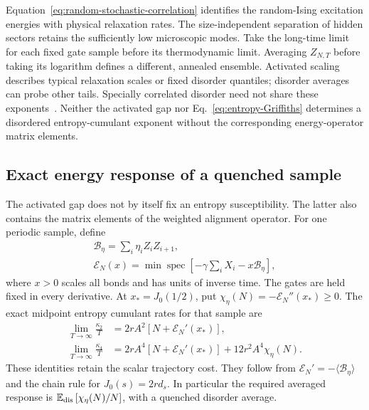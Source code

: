 \documentclass[aps,pre,reprint,amsmath,amssymb,longbibliography,floatfix]{revtex4-2}
\newcommand{\E}{\mathbb E}
\begin{document}
Equation~\eqref{eq:random-stochastic-correlation} identifies the
random-Ising excitation energies with physical relaxation rates.
The size-independent separation of hidden sectors retains the
sufficiently low microscopic modes.
Take the long-time limit for each fixed gate sample before its
thermodynamic limit. Averaging $Z_{N,T}$ before taking its logarithm
defines a different, annealed ensemble. Activated scaling describes
typical relaxation scales or fixed disorder quantiles; disorder averages
can probe other tails. Specially correlated disorder need not share
these exponents~\cite{ShiraiTanaka2021}. Neither the activated gap nor
Eq.~\eqref{eq:entropy-Griffiths} determines a disordered entropy-cumulant
exponent without the corresponding energy-operator matrix elements.

\subsection{Exact energy response of a quenched sample}
\label{app:random-energy-response}
The activated gap does not by itself fix an entropy susceptibility.
The latter also contains the matrix elements of the weighted alignment
operator. For one periodic sample, define
\begin{equation}
 \begin{gathered}
 \mathcal B_\eta=\sum_i\eta_iZ_iZ_{i+1},\\
 \mathscr E_N(x)=\min\operatorname{spec}
 \left[-\gamma\sum_iX_i-x\mathcal B_\eta\right],
 \end{gathered}
 \label{eq:random-bond-energy}
\end{equation}
where $x>0$ scales all bonds and has units of inverse time. The gates
are held fixed in every derivative. At $x_*=J_0(1/2)$, put
$\chi_\eta(N)=-\mathscr E_N''(x_*)\geq0$. The exact midpoint entropy
cumulant rates for that sample are
\begin{align}
 \lim_{T\to\infty}\frac{\kappa_2}{T}
 &=2rA^2\left[N+\mathscr E_N'(x_*)\right],\nonumber\\
 \lim_{T\to\infty}\frac{\kappa_4}{T}
 &=2rA^4\left[N+\mathscr E_N'(x_*)\right]
       +12r^2A^4\chi_\eta(N).
 \label{eq:random-entropy-response}
\end{align}
These identities retain the scalar trajectory cost. They follow from
$\mathscr E_N'=-\langle\mathcal B_\eta\rangle$ and the chain rule for
$J_0(s)=2rd_s$. In particular the required averaged response is
$\E_{\rm dis}\left[\chi_\eta(N)/N\right]$, with a quenched disorder average.
\end{document}
